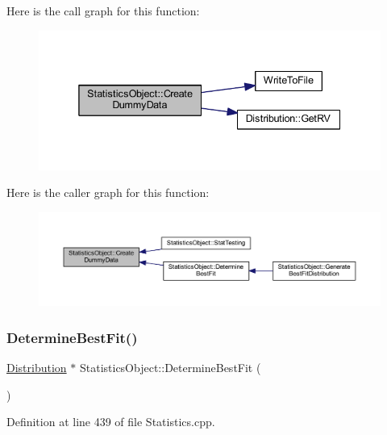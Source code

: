 Here is the call graph for this function\+:\nopagebreak
\begin{figure}[H]
\begin{center}
\leavevmode
\includegraphics[width=338pt]{class_statistics_object_a8177bcf97b01750d125852b888e11323_cgraph}
\end{center}
\end{figure}
Here is the caller graph for this function\+:\nopagebreak
\begin{figure}[H]
\begin{center}
\leavevmode
\includegraphics[width=350pt]{class_statistics_object_a8177bcf97b01750d125852b888e11323_icgraph}
\end{center}
\end{figure}
\mbox{\label{class_statistics_object_a13305945c9536243f926b61d554c2dd4}} 
\subsubsection{\texorpdfstring{Determine\+Best\+Fit()}{DetermineBestFit()}}
{\footnotesize\ttfamily \hyperlink{class_distribution}{Distribution} $\ast$ Statistics\+Object\+::\+Determine\+Best\+Fit (\begin{DoxyParamCaption}{ }\end{DoxyParamCaption})}



Definition at line 439 of file Statistics.\+cpp.

